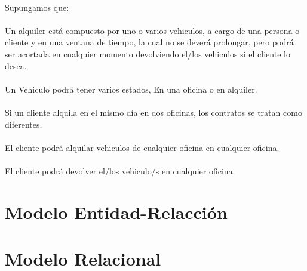 \documentclass[a4paper,10pt]{article}
\begin{document}
\paragraph{}
Supungamos que:

\paragraph{}
Un alquiler está compuesto por uno o varios vehiculos, a cargo de una persona o cliente y en una ventana de tiempo, la cual no se deverá prolongar, pero podrá ser acortada en cualquier momento devolviendo el/los vehiculos si el cliente lo desea.

\paragraph{}
Un Vehiculo podrá tener varios estados, En una oficina o en alquiler.

\paragraph{}
Si un cliente alquila en el mismo día en dos oficinas, los contratos se tratan como diferentes.

\paragraph{}
El cliente podrá alquilar vehiculos de cualquier oficina en cualquier oficina.

\paragraph{}
El cliente podrá devolver el/los vehiculo/s en cualquier oficina.



\pagebreak

\section{Modelo Entidad-Relacción}
\vspace{1cm}
\begin{centering}
  \hspace{-1.5cm}
  \scalebox{0.6}{}
\end{centering}


\pagebreak

\section{Modelo Relacional}
\end{document}
